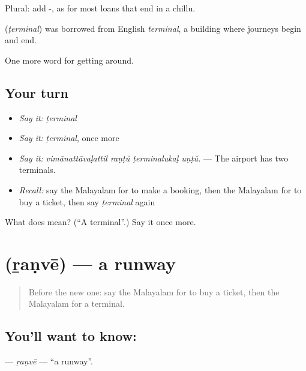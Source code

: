 Plural: add -, as for most loans that end in a chillu.

\begin{cousinweb}
\textbf{} (\emph{ṭerminal}) was borrowed from English \emph{terminal}, a building where journeys begin and end.
\end{cousinweb}

\begin{grammarlens}[title={What you've built}]
One more word for getting around.
\end{grammarlens}

\subsection*{Your turn}
\begin{itemize}
\raggedright
  \item \emph{Say it:} \emph{ṭerminal}
  \item \emph{Say it:} \emph{ṭerminal}, once more
  \item \emph{Say it:} \emph{vimānattāvaḷattil raṇṭŭ ṭerminalukaḷ uṇṭŭ.} — The airport has two terminals.
  \item \emph{Recall:} say the Malayalam for to make a booking, then the Malayalam for to buy a ticket, then say \emph{ṭerminal} again
\end{itemize}

\begin{tcolorbox}[breakable,colback=teal!4,colframe=teal!35!black,title={Before you move on}]
What does  mean? (\textquotedblleft{}A terminal\textquotedblright{}.) Say it once more.
\end{tcolorbox}
\section[\texorpdfstring{\ml{റൺവേ} (ṟaṇvē)}{റൺവേ (ṟaṇvē)}]{ (ṟaṇvē) — a runway}

\label{lesson:ML-C463-ranve}



\begin{quote}
Before the new one: say the Malayalam for to buy a ticket, then the Malayalam for a terminal.
\end{quote}

\subsection*{You'll want to know: }
\textbf{} — \emph{ṟaṇvē} — \textquotedblleft{}a runway\textquotedblright{}.

